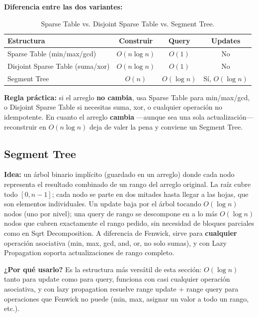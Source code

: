 \documentclass[10pt,a4paper,twocolumn]{article}
\begin{document}
\textbf{Diferencia entre las dos variantes:}

\begin{table}[H]
\raggedright
\scriptsize
\setlength{\tabcolsep}{3pt}
\begin{tabular}{|l|c|c|c|}
\hline
\textbf{Estructura} & \textbf{Construir} & \textbf{Query} & \textbf{Updates} \\
\hline
Sparse Table (min/max/gcd) & $O(n\log n)$ & $O(1)$ & No \\
\hline
Disjoint Sparse Table (suma/xor) & $O(n\log n)$ & $O(1)$ & No \\
\hline
Segment Tree & $O(n)$ & $O(\log n)$ & Sí, $O(\log n)$ \\
\hline
\end{tabular}
\caption{Sparse Table vs. Disjoint Sparse Table vs. Segment Tree.}
\end{table}

\textbf{Regla práctica:} si el arreglo \textbf{no cambia}, usa Sparse
Table para min/max/gcd, o Disjoint Sparse Table si necesitas suma,
xor, o cualquier operación no idempotente. En cuanto el arreglo
\textbf{cambia} —aunque sea una sola actualización— reconstruir en
$O(n\log n)$ deja de valer la pena y conviene un Segment Tree.




\subsection{Segment Tree}

\textbf{Idea:} un árbol binario implícito (guardado en un arreglo)
donde cada nodo representa el resultado combinado de un rango del
arreglo original. La raíz cubre todo $[0,n-1]$; cada nodo se parte en
dos mitades hasta llegar a las hojas, que son elementos individuales.
Un update baja por el árbol tocando $O(\log n)$ nodos (uno por nivel);
una query de rango se descompone en a lo más $O(\log n)$ nodos que
cubren exactamente el rango pedido, sin necesidad de bloques
parciales como en Sqrt Decomposition. A diferencia de Fenwick, sirve
para \textbf{cualquier} operación asociativa (min, max, gcd, and, or,
no solo sumas), y con Lazy Propagation soporta actualizaciones de
rango completo.

\textbf{¿Por qué usarlo?} Es la estructura más versátil de esta
sección: $O(\log n)$ tanto para update como para query, funciona con
casi cualquier operación asociativa, y con lazy propagation resuelve
range update + range query para operaciones que Fenwick no puede
(min, max, asignar un valor a todo un rango, etc.).
\end{document}
